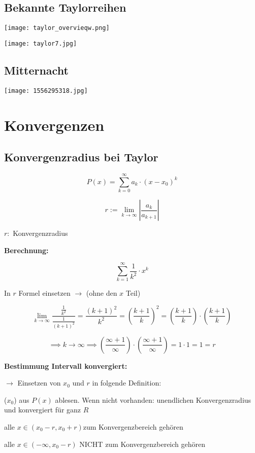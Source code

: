 \begin{multicols*}{3}
    \subsection{Bekannte Taylorreihen}

    { \texttt{[image: taylor\_overvieqw.png]} }

    { \texttt{[image: taylor7.jpg]} }

    \subsection{Mitternacht}
    { \texttt{[image: 1556295318.jpg]} }

    \vfill\null
    \columnbreak


    \section{Konvergenzen}
    \subsection{Konvergenzradius bei Taylor}

    $$P(x) = \sum_{k = 0}^{ \infty }a_k\cdot(x-x_0)^k$$

    {$$r:= \lim_{k \to \infty } |\frac{a_k}{a_{k+1}}| $$}

    {$r:$ Konvergenzradius}

    {\textbf{Berechnung:}}

    {$$\sum^{\infty}_{k=1}{\frac{1}{k^2}\cdot x^k}$$}

    {In $r$ Formel einsetzen $\to$ (ohne den $x$ Teil)}

    {$$ \lim_{k \to \infty} \frac{\frac{1}{k^2}}{\frac{1}{(k+1)^2}} = \frac{(k+1)^2}{k^2} = (\frac{k+1}{k})^2 = (\frac{k+1}{k}) \cdot (\frac{k+1}{k})  $$}

    {$$\implies k \to \infty \implies (\frac{\infty+1}{\infty}) \cdot (\frac{\infty+1}{\infty}) = 1 \cdot 1 = 1  =r$$}

    \textbf{Bestimmung Intervall konvergiert:}

    {$\to$ Einsetzen von $x_0$ und $r$ in folgende Definition:}

    {($x_0$) aus $P(x)$ ablesen. Wenn nicht vorhanden: unendlichen Konvergenzradius und konvergiert für ganz $R$ }


    {alle $x \in (x_0 -r,x_0 + r)$zum Konvergenzbereich gehören }



    {alle $x \in (-\infty,x_0 - r)$ NICHT zum Konvergenzbereich gehören }



\end{multicols*}

